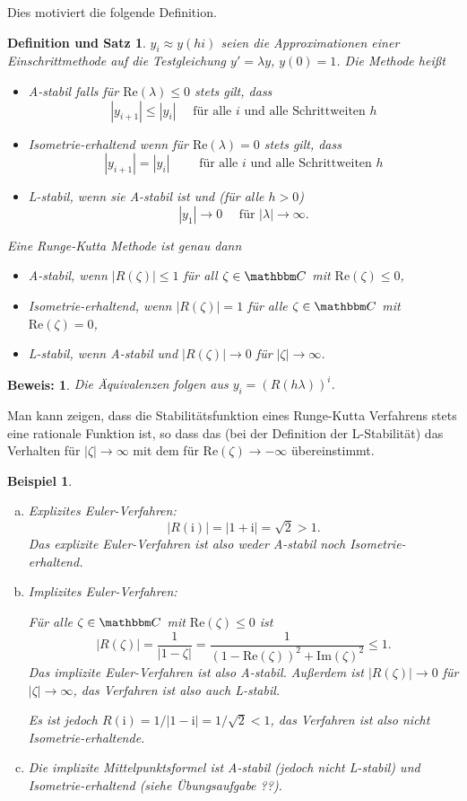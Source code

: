 \documentclass[12pt,a4paper]{book}
\theoremstyle{break}
\newtheorem{beispiel}[theorem]{Beispiel}
\newtheorem{definitiontheorem}[theorem]{Definition und Satz}
\theoremstyle{nonumberplain}
\newtheorem{beweis}{Beweis:}
\newcommand{\C}{\mathbbm C}
\renewcommand{\Re}{\mathrm{Re}}
\renewcommand{\Im}{\mathrm{Im}}
\newcommand{\1}{\mathbbm{1}} 			      	%
\newcommand{\im}{\ensuremath{\mathrm{i}}} 			      	%
\begin{document}
Dies motiviert die folgende Definition.
\begin{definitiontheorem}\label{defthm:stability}
$y_i\approx y(hi)$ seien die Approximationen einer Einschrittmethode auf die Testgleichung $y'=\lambda y$, $y(0)=1$.
Die Methode heißt
\begin{itemize}
\item \emph{A-stabil} falls für $\Re(\lambda)\leq 0$ stets gilt, dass
\[
|y_{i+1}|\leq |y_i| \quad \mbox{ für alle $i$ und alle Schrittweiten $h$}
\]
\item \emph{Isometrie-erhaltend} wenn für $\Re(\lambda)=0$ stets gilt, dass
\[
|y_{i+1}|=|y_i|\quad \quad \mbox{ für alle $i$ und alle Schrittweiten $h$}
\]
\item \emph{L-stabil}, wenn sie A-stabil ist und (für alle $h>0$) 
\[
|y_1|\to 0 \quad \mbox{ für } |\lambda|\to \infty.
\]
\end{itemize}
Eine Runge-Kutta Methode ist genau dann
\begin{itemize}
\item A-stabil, wenn $|R(\zeta)|\leq 1$ für all $\zeta\in \C$ mit $\Re(\zeta)\leq 0$,
\item Isometrie-erhaltend, wenn $|R(\zeta)|=1$ für alle $\zeta\in \C$ mit $\Re(\zeta)= 0$,
\item L-stabil, wenn A-stabil und $|R(\zeta)|\to 0$ für $|\zeta|\to \infty$.
\end{itemize}
\end{definitiontheorem}
\begin{beweis}
Die Äquivalenzen folgen aus $y_i=(R(h\lambda))^i$.
\end{beweis}

Man kann zeigen, dass die Stabilitätsfunktion eines Runge-Kutta Verfahrens stets eine rationale Funktion ist, so
dass das (bei der Definition der L-Stabilität) das Verhalten für $|\zeta|\to \infty$ mit dem für $\Re(\zeta)\to -\infty$ übereinstimmt.

\begin{beispiel}
\begin{enumerate}[(a)]
\item Explizites Euler-Verfahren:
\[
|R(\im)|=|1+\im|=\sqrt{2}>1.
\]
Das explizite Euler-Verfahren ist also weder A-stabil noch Isometrie-erhaltend.
%
\item Implizites Euler-Verfahren:

Für alle $\zeta\in \C$ mit $\Re(\zeta)\leq 0$ ist
\[
|R(\zeta)|=\frac{1}{|1-\zeta|}=\frac{1}{(1-\Re(\zeta))^2+\Im(\zeta)^2}\leq 1.
\]
Das implizite Euler-Verfahren ist also A-stabil. Außerdem ist $|R(\zeta)|\to 0$ für $|\zeta|\to \infty$, das Verfahren ist also auch L-stabil.

Es ist jedoch $R(\im)=1/|1-\im|=1/\sqrt{2}< 1$, das Verfahren ist also nicht Isometrie-erhaltende.
\item Die implizite Mittelpunktsformel ist A-stabil (jedoch nicht L-stabil) und Isometrie-erhaltend (siehe Übungsaufgabe ??).
\end{enumerate}
\end{beispiel}
\end{document}
